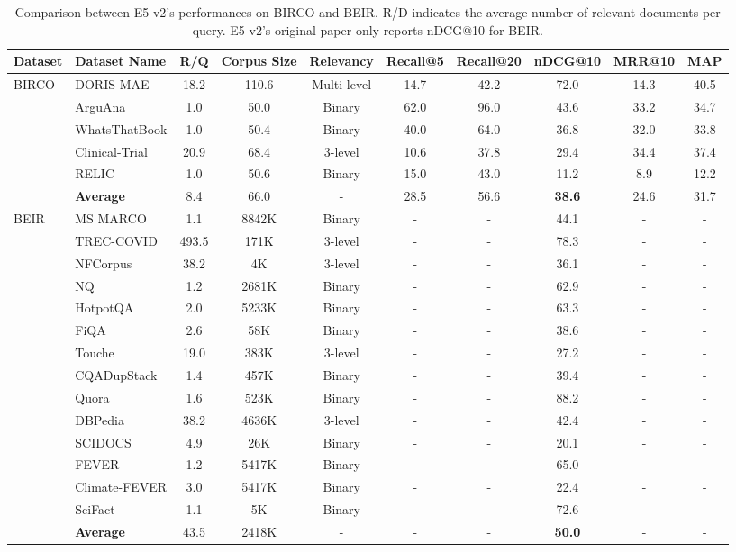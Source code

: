\documentclass[11pt]{article}
\begin{document}
\begin{table}[htbp]
\centering
\setlength{\tabcolsep}{1.7pt}
\footnotesize
\begin{tabular}{llcccccccc}
\toprule
Dataset & Dataset Name & R/Q & Corpus Size & Relevancy & Recall@5 & Recall@20 & nDCG@10 & MRR@10 & MAP \\
\midrule
\multirow{5}{*}{BIRCO} & DORIS-MAE & 18.2 & 110.6 & Multi-level & 14.7 & 42.2 & 72.0 & 14.3 & 40.5 \\
 & ArguAna & 1.0 & 50.0 & Binary & 62.0 & 96.0 & 43.6 & 33.2 & 34.7 \\
 & WhatsThatBook & 1.0 & 50.4 & Binary & 40.0 & 64.0 & 36.8 & 32.0 & 33.8 \\
 & Clinical-Trial & 20.9 & 68.4 & 3-level & 10.6 & 37.8 & 29.4 & 34.4 & 37.4 \\
 & RELIC & 1.0 & 50.6 & Binary & 15.0 & 43.0 & 11.2 & 8.9 & 12.2 \\
 & \textbf{Average} & 8.4 & 66.0 & - & 28.5 & 56.6 & \textbf{38.6} & 24.6 & 31.7 \\
 \midrule

 \multirow{14}{*}{BEIR} & MS MARCO & 1.1 & 8842K & Binary & - & - & 44.1 & - & - \\
 & TREC-COVID & 493.5 & 171K & 3-level & - & - & 78.3 & - & - \\
 & NFCorpus & 38.2 & 4K & 3-level & - & - & 36.1 & - & - \\
 & NQ & 1.2 & 2681K & Binary & - & - & 62.9 & - & - \\
 & HotpotQA & 2.0 & 5233K & Binary & - & - & 63.3 & - & - \\
 & FiQA & 2.6 & 58K & Binary & - & - & 38.6 & - & - \\
 & Touche & 19.0 & 383K & 3-level & - & - & 27.2 & - & - \\
 & CQADupStack & 1.4 & 457K & Binary & - & - & 39.4 & - & - \\
 & Quora & 1.6 & 523K & Binary & - & - & 88.2 & - & - \\
 & DBPedia & 38.2 & 4636K & 3-level & - & - & 42.4 & - & - \\
 & SCIDOCS & 4.9 & 26K & Binary & - & - & 20.1 & - & - \\
 & FEVER & 1.2 & 5417K & Binary & - & - & 65.0 & - & - \\
 & Climate-FEVER & 3.0 & 5417K & Binary & - & - & 22.4 & - & - \\
 & SciFact & 1.1 & 5K & Binary & - & - & 72.6 & - & - \\
 & \textbf{Average} & 43.5 & 2418K & - & - & - & \textbf{50.0} & - & - \\
\bottomrule
\end{tabular}
\caption{Comparison between E5-v2's performances on BIRCO and BEIR. R/D indicates the average number of relevant documents per query. E5-v2's original paper only reports nDCG@10 for BEIR.}
\label{tab: appendix_comparison_between_birco_and_beir}
\end{table}
\end{document}
